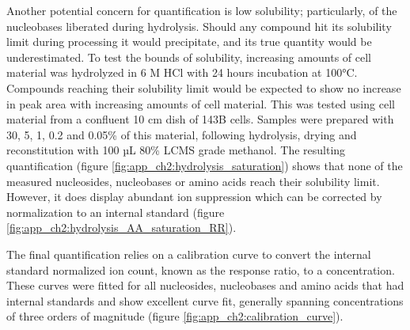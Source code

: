 Another potential concern for quantification is low solubility; particularly, of the nucleobases liberated during hydrolysis.
Should any compound hit its solubility limit during processing it would precipitate, and its true quantity would be underestimated.
To test the bounds of solubility, increasing amounts of cell material was hydrolyzed in 6 M HCl with 24 hours incubation at 100°C.
Compounds reaching their solubility limit would be expected to show no increase in peak area with increasing amounts of cell material.
This was tested using cell material from a confluent 10 cm dish of 143B cells.
Samples were prepared with 30, 5, 1, 0.2 and 0.05\% of this material, following hydrolysis, drying and reconstitution with 100 µL 80\% LCMS grade methanol.
The resulting quantification (figure \ref{fig:app_ch2:hydrolysis_saturation}) shows that none of the measured nucleosides, nucleobases or amino acids reach their solubility limit.
However, it does display abundant ion suppression which can be corrected by normalization to an internal standard (figure \ref{fig:app_ch2:hydrolysis_AA_saturation_RR}).

The final quantification relies on a calibration curve to convert the internal standard normalized ion count, known as the response ratio, to a concentration.
These curves were fitted for all nucleosides, nucleobases and amino acids that had internal standards and show excellent curve fit, generally spanning concentrations of three orders of magnitude (figure \ref{fig:app_ch2:calibration_curve}).

